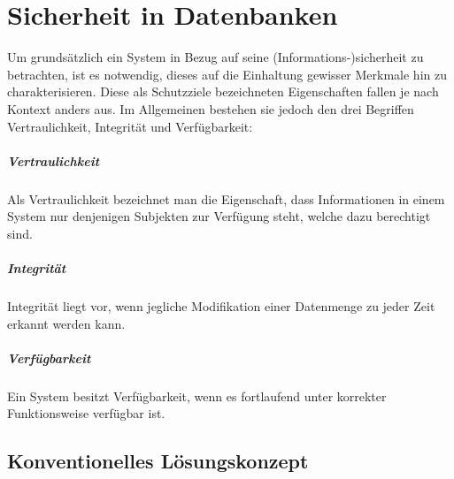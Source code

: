 
\chapter{Sicherheit in Datenbanken}

Um grundsätzlich ein System in Bezug auf seine (Informations-)sicherheit zu betrachten, ist es notwendig, dieses auf die Einhaltung gewisser Merkmale hin zu charakterisieren. Diese als Schutzziele bezeichneten Eigenschaften fallen je nach Kontext anders aus. Im Allgemeinen bestehen sie jedoch den drei Begriffen Vertraulichkeit, Integrität und Verfügbarkeit:

\paragraph{Vertraulichkeit}
Als Vertraulichkeit bezeichnet man die Eigenschaft, dass Informationen in einem System nur denjenigen Subjekten zur Verfügung steht, welche dazu berechtigt sind.

\paragraph{Integrität}
Integrität liegt vor, wenn jegliche Modifikation einer Datenmenge zu jeder Zeit erkannt werden kann.

\paragraph{Verfügbarkeit}
Ein System besitzt Verfügbarkeit, wenn es fortlaufend unter korrekter Funktionsweise verfügbar ist.

\section{Konventionelles Lösungskonzept}

